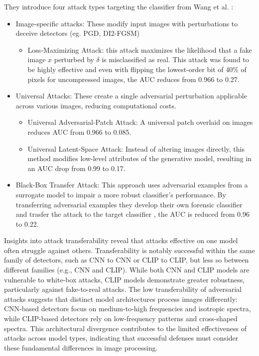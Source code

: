 \documentclass[conference]{IEEEtran} %
\begin{document}
        They introduce four attack types targeting the classifier from Wang et al. \cite{Wang_2020_CVPR}:
        \begin{itemize}
            \item Image-specific attacks: These modify input images with perturbations to deceive detectors (eg. PGD, DI2-FGSM)
            \begin{itemize}
            \item Loss-Maximizing Attack: this attack maximizes the likelihood that a fake image $x$ perturbed by $\delta$ is misclassified as real. This attack was found to be highly effective and even with flipping the lowest-order bit of 40\% of pixels for uncompressed images, the AUC reduces from 0.966 to 0.27.
            \end{itemize}
            \item Universal Attacks: These create a single adversarial perturbation applicable across various images, reducing computational costs.
            \begin{itemize}
                \item  Universal Adversarial-Patch Attack: A universal patch overlaid on images reduces AUC from 0.966 to 0.085.
                \item Universal Latent-Space Attack: Instead of altering images directly, this method modifies low-level attributes of the generative model, resulting in an AUC drop from 0.99 to 0.17.
            \end{itemize} 
            \item Black-Box Transfer Attack: This approach uses adversarial examples from a surrogate model to impair a more robust classifier's performance. By transferring adversarial examples they develop their own forensic classifier and trasfer the attack to the target classifier \cite{Wang_2020_CVPR}, the AUC is reduced from 0.96 to 0.22. 
        \end{itemize}
        
        Insights into attack transferability \cite{mardeenpaper2} reveal that attacks effective on one model often struggle against others. Transferability is notably successful within the same family of detectors, such as CNN to CNN or CLIP to CLIP, but less so between different families (e.g., CNN and CLIP). While both CNN and CLIP models are vulnerable to white-box attacks, CLIP models demonstrate greater robustness, particularly against fake-to-real attacks.
        The low transferability of adversarial attacks suggests that distinct model architectures process images differently:
        CNN-based detectors focus on medium-to-high frequencies and isotropic spectra, while CLIP-based detectors rely on low-frequency patterns and cross-shaped spectra.
        This architectural divergence contributes to the limited effectiveness of attacks across model types, indicating that successful defenses must consider these fundamental differences in image processing.
        
\end{document}
